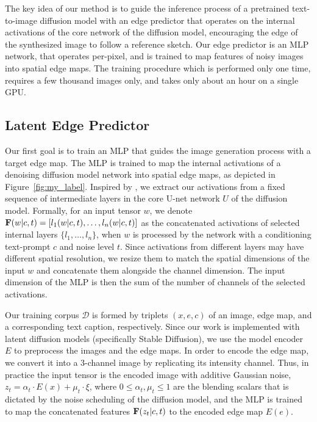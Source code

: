 The key idea of our method is to guide the inference process of a pretrained text-to-image diffusion model with an edge predictor that operates on the internal activations of the core network of the diffusion model, encouraging the edge of the synthesized image to follow a reference sketch. Our edge predictor is an MLP network, that operates per-pixel, and is trained to map features of noisy images into spatial edge maps. The training procedure which is performed only one time, requires a few thousand images only, and takes only about an hour on a single GPU. 

\subsection{Latent Edge Predictor}

Our first goal is to train an MLP that guides the image generation process with a target edge map. The MLP is trained to map the internal activations of a denoising diffusion model network into spatial edge maps, as depicted in Figure~\ref{fig:my_label}. Inspired by \cite{baranchuk2021label}, we extract our activations from a fixed sequence of intermediate layers in the core U-net network $U$ of the diffusion model. Formally, for an input tensor $w$, we denote ${\bf F}(w|  c, t)= \left[l_1(w |  c, t), \dots, l_n(w|  c, t)\right]$ as the concatenated activations of selected internal layers $\{l_1, \dots, l_n\}$, when $w$ is processed by the network with a conditioning text-prompt $c$ and noise level $t$. Since activations from different layers may have different spatial resolution, we resize them to match the spatial dimensions of the input $w$ and concatenate them alongside the channel dimension. The input dimension of the MLP is then the sum of the number of channels of the selected activations.

Our training corpus $\mathcal{D}$ is formed by triplets $(x, e, c)$ of an image, edge map, and a corresponding text caption, respectively. Since our work is implemented with latent diffusion models (specifically Stable Diffusion), we use the model encoder $E$ to preprocess the images and the edge maps. In order to encode the edge map, we convert it into a 3-channel image by replicating its intensity channel. Thus, in practice the input tensor is the encoded image with additive Gaussian noise, $z_t = \alpha_t \cdot E(x) + \mu_t \cdot \xi $, where $0\leq\alpha_t, \mu_t\leq 1$ are the blending scalars that is dictated by the noise scheduling of the diffusion model, and the MLP is trained to map the concatenated features ${\bf F}(z_t | c, t)$ to the encoded edge map $E(e)$.  

